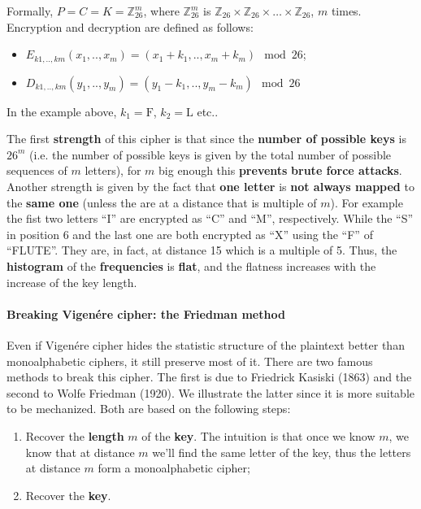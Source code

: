 Formally, $P = C = K = \mathbb{Z}_{26}^m$, where $\mathbb{Z}_{26}^m$ is $\mathbb{Z}_{26}\times\mathbb{Z}_{26}\times\ldots\times\mathbb{Z}_{26}$, $m$ times. Encryption and decryption are defined as follows:

\begin{itemize}
    \item $E_{k1, .., km}(x_1, .., x_m) = (x_1 + k_1, .., x_m + k_m)\mod26$;
    \item $D_{k1, .., km}(y_1, .., y_m) = (y_1 - k_1, .., y_m - k_m)\mod26$
\end{itemize}

In the example above, $k_1 = \text{F}$, $k_2 = \text{L}$ etc..

The first \textbf{strength} of this cipher is that since the \textbf{number of possible keys} is $26^m$ (i.e. the number of possible keys is given by the total number of possible sequences of $m$ letters), for $m$ big enough this \textbf{prevents} \textbf{brute force attacks}. Another strength is given by the fact that \textbf{one letter} is \textbf{not always mapped} to the \textbf{same one} (unless the are at a distance that is multiple of $m$). For example the fist two letters “I” are encrypted as “C” and “M”, respectively. While the “S” in position 6 and the last one are both encrypted as “X” using the “F” of “FLUTE”. They are, in fact, at distance 15 which is a multiple of 5. Thus, the \textbf{histogram} of the \textbf{frequencies} is \textbf{flat}, and the flatness increases with the increase of the key length. 

\paragraph{Breaking Vigenére cipher: the Friedman method} Even if Vigenére cipher hides the statistic structure of the plaintext better than monoalphabetic ciphers, it still preserve most of it. There are two famous methods to break this cipher. The first is due to Friedrick Kasiski (1863) and the second to Wolfe Friedman (1920). We illustrate the latter since it is more suitable to be mechanized. Both are based on the following steps:

\begin{enumerate}
    \item Recover the \textbf{length} $m$ of the \textbf{key}. The intuition is that once we know $m$, we know that at distance $m$ we'll find the same letter of the key, thus the letters at distance $m$ form a monoalphabetic cipher;
    \item Recover the \textbf{key}.
\end{enumerate}

